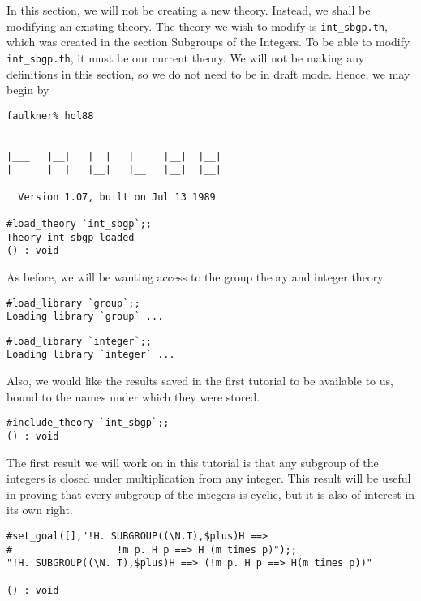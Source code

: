 In this section, we will not be creating a new theory.  Instead, we
shall be modifying an existing theory.  The theory we wish to modify
is {\small\verb+int_sbgp.th+}, which was created in the section
Subgroups of the Integers.  To be able to modify
{\small\verb+int_sbgp.th+}, it must be our current theory.  We will
not be making any definitions in this section, so we do not need to be
in draft mode.  Hence, we may begin by
\begin{session}
\begin{verbatim}
faulkner% hol88

       _  _    __    _      __    __
|___   |__|   |  |   |     |__|  |__|
|      |  |   |__|   |__   |__|  |__|

  Version 1.07, built on Jul 13 1989

#load_theory `int_sbgp`;;
Theory int_sbgp loaded
() : void
\end{verbatim}
\end{session}

As before, we will be wanting access to the group theory and integer
theory.
\begin{session}
\begin{verbatim}
#load_library `group`;;
Loading library `group` ...
\end{verbatim}
\mvdots
\begin{verbatim}
#load_library `integer`;;
Loading library `integer` ...
\end{verbatim}
\evdots
\end{session}

Also, we would like the results saved in the first tutorial to be
available to us, bound to the names under which they were stored.
\begin{session}
\begin{verbatim}
#include_theory `int_sbgp`;;
() : void

\end{verbatim}
\end{session}

The first result we will work on in this tutorial is that any
subgroup of the integers is closed under multiplication from any
integer.  This result will be useful in proving that every subgroup of
the integers is cyclic, but it is also of interest in its own right.
\begin{session}
\begin{verbatim}
#set_goal([],"!H. SUBGROUP((\N.T),$plus)H ==> 
#                  !m p. H p ==> H (m times p)");;
"!H. SUBGROUP((\N. T),$plus)H ==> (!m p. H p ==> H(m times p))"

() : void
\end{verbatim}
\end{session}

